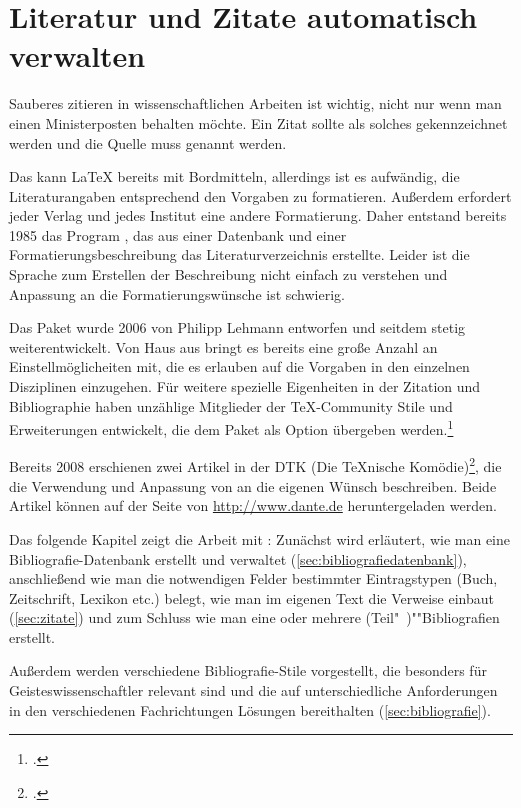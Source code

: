 \chapter{Literatur und Zitate automatisch verwalten}
\label{biblatex}

\noindent Sauberes zitieren in wissenschaftlichen Arbeiten ist wichtig,
nicht nur wenn man einen Ministerposten behalten möchte.
Ein Zitat sollte als solches gekennzeichnet werden und die Quelle muss genannt werden.

Das kann \LaTeX{} bereits mit Bordmitteln, 
allerdings ist es aufwändig,
die Literaturangaben entsprechend den Vorgaben zu formatieren.
Außerdem erfordert jeder Verlag und jedes Institut eine andere Formatierung.
Daher entstand bereits 1985 das Program \BibTeX,
das aus einer Datenbank und einer Formatierungsbeschreibung das Literaturverzeichnis erstellte.
Leider ist die Sprache zum Erstellen der Beschreibung nicht einfach zu verstehen
und Anpassung an die Formatierungswünsche ist schwierig.

Das Paket  wurde 2006 %
von Philipp Lehmann entworfen und seitdem stetig weiterentwickelt. 
Von Haus aus bringt es bereits eine große Anzahl an Einstellmöglicheiten mit, 
die es erlauben auf die Vorgaben in den einzelnen Disziplinen einzugehen. 
Für weitere spezielle Eigenheiten in der Zitation und Bibliographie haben unzählige Mitglieder der \TeX -Community Stile und Erweiterungen entwickelt,
die dem  Paket als Option übergeben werden.\footcite{voss:bibliografien}

Bereits 2008 erschienen zwei Artikel in der DTK (Die TeXnische Komödie)\footcite{wassenhoven:dtk2008/2,wassenhoven:dtk2008/4}, 
die die Verwendung und Anpassung von  an die eigenen Wünsch beschreiben.
Beide Artikel können auf der Seite von \url{http://www.dante.de} heruntergeladen werden.

Das folgende Kapitel zeigt die Arbeit mit : 
Zunächst wird erläutert, wie man eine Bibliografie-Datenbank erstellt und verwaltet (\cref{sec:bibliografiedatenbank}),
anschließend wie man die notwendigen Felder bestimmter Eintragstypen (Buch, Zeitschrift, Lexikon etc.) belegt, 
wie man im eigenen Text die Verweise einbaut (\cref{sec:zitate}) und
zum Schluss wie man eine oder mehrere (Teil"~)""Bibliografien erstellt.

Außerdem werden verschiedene Bibliografie-Stile vorgestellt,
die besonders für Geisteswissenschaftler relevant sind und die auf unterschiedliche Anforderungen in den verschiedenen Fachrichtungen Lösungen bereithalten (\cref{sec:bibliografie}).

